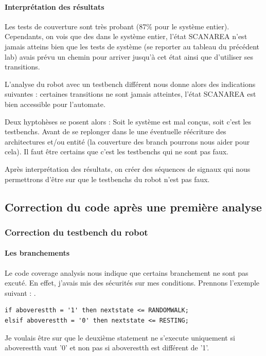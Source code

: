\documentclass{article}
\newcommand{\sautligne}{
\textbf{\vspace{5mm}}
}
\begin{document}
\paragraph{Interprétation des résultats}
Les tests de couverture sont très probant (87\% pour le système entier). Cependants, on vois que des dans le système entier, l'état SCANAREA n'est jamais atteins bien que les tests de système (se reporter au tableau du précédent lab) avais prévu un chemin pour arriver jusqu'à cet état ainsi que d'utiliser ses transitions. 

L'analyse du robot avec un testbench différent nous donne alors des indications suivantes : certaines transitions ne sont jamais atteintes, l'état SCANAREA est bien accessible pour l'automate. 
\sautligne

Deux hyptohèses se posent alors : Soit le système est mal conçus, soit c'est les testbenchs. Avant de se replonger dans le une éventuelle réécriture des architectures et/ou entité (la couverture des branch pourrons nous aider pour cela). Il faut être certains que c'est les testbenchs qui ne sont pas faux.

Après interprétation des résultats, on créer des séquences de signaux qui nous permettrons d'être sur que le testbenchs du robot n'est pas faux.



\subsection{Correction du code après une première analyse }

\subsubsection{Correction du testbench du robot}

\paragraph{Les branchements}

Le code coverage analysis nous indique que certains branchement ne sont pas excuté. En effet, j'avais mis des sécurités sur mes conditions. Prennons l'exemple suivant : .

\begin{verbatim}
if aboverestth = '1' then nextstate <= RANDOMWALK;
elsif aboverestth = '0' then nextstate <= RESTING;
\end{verbatim} 

Je voulais être sur que le deuxième statement ne s'execute uniquement si aboverestth vaut '0' et non pas si aboverestth est différent de '1'.
\end{document}
